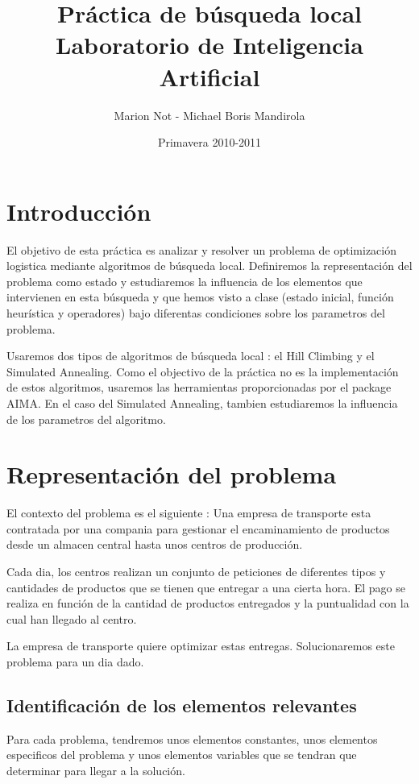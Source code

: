 \documentclass{article}
\title{\Huge{Práctica de búsqueda local} \\
\vspace{15mm}
   \Large{Laboratorio de Inteligencia Artificial}}
\author{Marion Not - Michael Boris Mandirola}
\date{Primavera 2010-2011}
\begin{document}
\maketitle
\newpage
\tableofcontents
\newpage
\section*{Introducción}
El objetivo de esta práctica es analizar y resolver un problema de optimización
logistica mediante algoritmos de búsqueda local. Definiremos la representación
del problema como estado y estudiaremos la influencia de los elementos que
intervienen en esta búsqueda y que hemos visto a clase (estado inicial, función
heurística y operadores) bajo diferentas condiciones sobre los parametros del
problema.

Usaremos dos tipos de algoritmos de búsqueda local : el Hill Climbing y el
Simulated Annealing. Como el objectivo de la práctica no es la implementación de
estos algoritmos, usaremos las herramientas proporcionadas por el package AIMA. 
En el caso del Simulated Annealing, tambien estudiaremos la influencia de los 
parametros del algoritmo.

\section{Representación del problema}
El contexto del problema es el siguiente : Una empresa de transporte esta
contratada por una compania para gestionar el encaminamiento de productos desde
un almacen central hasta unos centros de producción.

Cada dia, los centros realizan un conjunto de peticiones de diferentes tipos y 
cantidades de productos que se tienen que entregar a una cierta hora. El pago se
realiza en función de la cantidad de productos entregados y la puntualidad con
la cual han llegado al centro.

La empresa de transporte quiere optimizar estas entregas. Solucionaremos este
problema para un dia dado.

\subsection{Identificación de los elementos relevantes}
Para cada problema, tendremos unos elementos constantes, unos elementos
especificos del problema y unos elementos variables que se tendran que
determinar para llegar a la solución.
\end{document}
